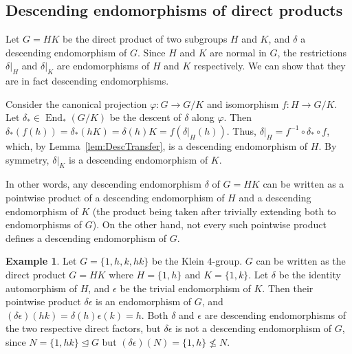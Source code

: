 \documentclass[11pt, a4paper]{article}
\DeclareMathOperator{\End}{End}
\theoremstyle{definition}
\newtheorem{Example}[Theorem]{Example}
\begin{document}
\subsection{Descending endomorphisms of direct products}\label{subsec:End*(HxK)}
Let $G = HK$ be the direct product of two subgroups $H$ and $K$, and $\delta$ a descending endomorphism of $G$. Since $H$ and $K$ are normal in $G$, the restrictions $\delta|_H$ and $\delta|_K$ are endomorphisms of $H$ and $K$ respectively. We can show that they are in fact descending endomorphisms.

Consider the canonical projection $\varphi \colon G \to G/K$ and isomorphism $f \colon H \to G/K$. Let $\delta_* \in \End_*(G/K)$ be the descent of $\delta$ along $\varphi$. Then $\delta_*(f(h)) = \delta_*(hK) = \delta(h)K = f(\delta|_H(h))$. Thus, $\delta|_H = f^{-1} \circ \delta_* \circ f$, which, by Lemma~\ref{lem:DescTransfer}, is a descending endomorphism of $H$. By symmetry, $\delta|_K$ is a descending endomorphism of $K$.

In other words, any descending endomorphism $\delta$ of $G = HK$ can be written as a pointwise product of a descending endomorphism of $H$ and a descending endomorphism of $K$ (the product being taken after trivially extending both to endomorphisms of $G$). On the other hand, not every such pointwise product defines a descending endomorphism of $G$.

\begin{Example}\label{ex:V4Desc}
Let $G = \{1, h, k, hk\}$ be the Klein $4$-group. $G$ can be written as the direct product $G = HK$ where $H = \{1, h\}$ and $K = \{1, k\}$. Let $\delta$ be the identity automorphism of $H$, and $\epsilon$ be the trivial endomorphism of $K$. Then their pointwise product $\delta \epsilon$ is an endomorphism of $G$, and $(\delta\epsilon)(hk) = \delta(h)\epsilon(k) = h$. Both $\delta$ and $\epsilon$ are descending endomorphisms of the two respective direct factors, but $\delta\epsilon$ is not a descending endomorphism of $G$, since $N = \{1, hk\} \unlhd G$ but $(\delta\epsilon)(N) = \{1, h\} \not\le N$.
\end{Example}
\end{document}
